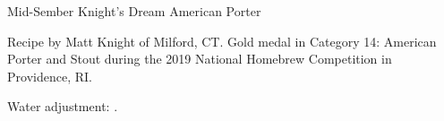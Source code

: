 \begin{recipe}{Mid-Sember Knight's Dream American Porter}

\begin{aboutblock}
Recipe by Matt Knight of Milford, CT. Gold medal in Category 14: American
Porter and Stout during the 2019 National Homebrew Competition in
Providence, RI. \sourceaha
\end{aboutblock}


\begin{methodandtiming}
 
\begin{mashsteps}
\end{mashsteps}

\begin{fermentationsteps}
\end{fermentationsteps}

\begin{directions}
Water adjustment: .
\end{directions}

\end{methodandtiming}

\recipebreak

\begin{ingredientsblock}

\begin{malts}
\end{malts}

\begin{hops}
\end{hops}


\end{ingredientsblock}

\end{recipe}
